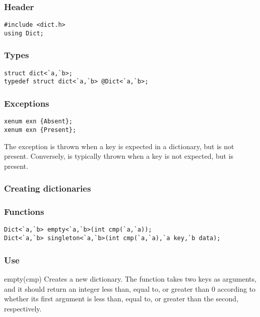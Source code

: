 \subsubsection*{Header}
\begin{verbatim}
#include <dict.h>
using Dict;
\end{verbatim}

\subsubsection*{Types}
\begin{verbatim}
struct dict<`a,`b>;
typedef struct dict<`a,`b> @Dict<`a,`b>;
\end{verbatim}

\subsubsection*{Exceptions}
\begin{verbatim}
xenum exn {Absent};
xenum exn {Present};
\end{verbatim}

The exception  is thrown when a key is expected in a
dictionary, but is not present.  Conversely,  is
typically thrown when a key is not expected, but is present.


\subsubsection*{Creating dictionaries}

\subsubsection*{Functions}
\begin{verbatim}
Dict<`a,`b> empty<`a,`b>(int cmp(`a,`a));
Dict<`a,`b> singleton<`a,`b>(int cmp(`a,`a),`a key,`b data);
\end{verbatim}

\subsubsection*{Use}
\begin{defun}{empty}{(cmp)}
Creates a new dictionary.  The function  takes two keys as
arguments, and it should return an integer less than, equal to, or
greater than 0 according to whether its first argument is less than,
equal to, or greater than the second, respectively.
\end{defun}

